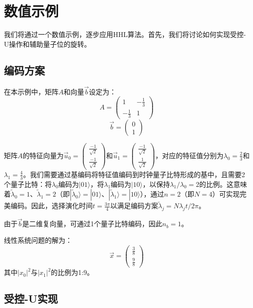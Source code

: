 \documentclass{article}
\begin{document}
\section{数值示例}

我们将通过一个数值示例，逐步应用HHL算法。首先，我们将讨论如何实现受控-U操作和辅助量子位的旋转。

\subsection{编码方案}

在本示例中，矩阵\(A\)和向量\(\vec{b}\)设定为：
\[
A = \begin{pmatrix} 1 & -\frac{1}{3} \\ -\frac{1}{3} & 1 \end{pmatrix}
\]
\[
\vec{b} = \begin{pmatrix} 0 \\ 1 \end{pmatrix}
\]

矩阵\(A\)的特征向量为\(\vec{u}_0 = \begin{pmatrix} \frac{-1}{\sqrt{2}} \\ \frac{-1}{\sqrt{2}} \end{pmatrix}\)和\(\vec{u}_1 = \begin{pmatrix} \frac{-1}{\sqrt{2}} \\ \frac{1}{\sqrt{2}} \end{pmatrix}\)，对应的特征值分别为\(\lambda_0 = \frac{2}{3}\)和\(\lambda_1 = \frac{4}{3}\)。我们需要通过基编码将特征值编码到时钟量子比特形成的基中，且需要2个量子比特：将\(\lambda_0\)编码为\(|01\rangle\)，将\(\lambda_1\)编码为\(|10\rangle\)，以保持\(\lambda_1/\lambda_0 = 2\)的比例。这意味着\(\tilde{\lambda}_0 = 1\)、\(\tilde{\lambda}_1 = 2\)（即\(|\tilde{\lambda}_0\rangle = |01\rangle\)、\(|\tilde{\lambda}_1\rangle = |10\rangle\)），通过\(n=2\)（即\(N=4\)）可实现完美编码。因此，选择演化时间\(t = \frac{3\pi}{4}\)以满足编码方案\(\tilde{\lambda}_j = N\lambda_j t / 2\pi\)。

由于\(\vec{b}\)是二维复向量，可通过1个量子比特编码，因此\(n_b = 1\)。

线性系统问题的解为：
\[
\vec{x} = \begin{pmatrix} \frac{3}{8} \\ \frac{9}{8} \end{pmatrix}
\]
其中\(|x_0|^2\)与\(|x_1|^2\)的比例为1:9。

\subsection{受控-U实现}
\end{document}

